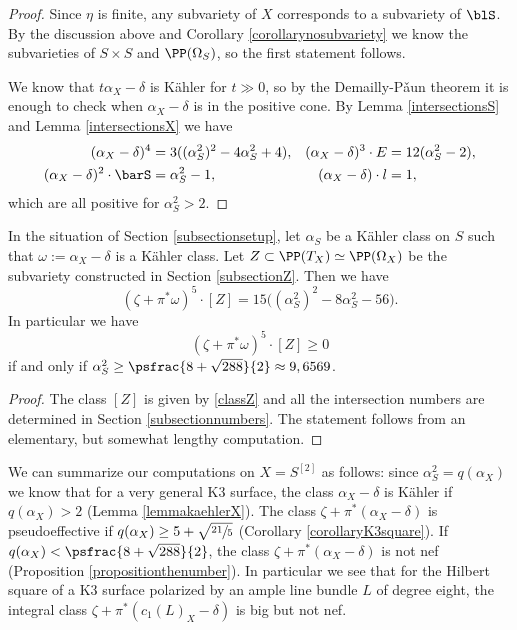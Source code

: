 \begin{proof}
Since $\eta$ is finite, any subvariety of $X$ corresponds to a subvariety of $\blS$. By the discussion above
and Corollary \ref{corollarynosubvariety}
we know the subvarieties of $S \times S$ and $\PP(\Omega_S)$, so the first statement follows.

We know that $t \alpha_X-\delta$ is Kähler for $t \gg 0$, so by the Demailly-P\v aun theorem it is enough to check when
$\alpha_X-\delta$ is in the positive cone. By Lemma \ref{intersectionsS} and Lemma \ref{intersectionsX} we have
\begin{align*}
(\alpha_X-\delta)^4 &= 3 ((\alpha_S^2)^2-4\alpha_S^2+4), &
(\alpha_X-\delta)^3 \cdot E &= 12 (\alpha_S^2-2),
\\
(\alpha_X-\delta)^2 \cdot \barS &= \alpha_S^2-1, &
(\alpha_X-\delta) \cdot l &= 1,
\end{align*}
which are all positive for $\alpha_S^2>2$.
\end{proof}

\begin{proposition} \label{propositionthenumber}
In the situation of Section \ref{subsectionsetup}, let
$\alpha_S$ be a Kähler class on $S$ such that $\omega:= \alpha_X-\delta$ is a Kähler class.
Let $Z \subset \PP(T_X) \simeq \PP(\Omega_X) $ be the subvariety constructed in Section \ref{subsectionZ}. Then we have
\[
(\zeta + \pi^* \omega)^5 \cdot [Z] =
15 \bigl(
(\alpha_S^2)^2 - 8 \alpha_S^2 - 56
\bigr).
\]
In particular we have
\[
(\zeta + \pi^* \omega)^5 \cdot [Z] \geq 0
\]
if and only if $\alpha_S^2 \geq \psfrac{8+\sqrt{288}}{2} \approx 9,6569$.
\end{proposition}

\begin{proof}
The class $[Z]$ is given by \eqref{classZ} and all the intersection numbers are determined in Section \ref{subsectionnumbers}. The statement follows from an elementary, but somewhat lengthy computation.
\end{proof}

We can summarize our computations on $X=S^{[2]}$ as follows:
since $\alpha_S^2=q(\alpha_X)$ we know that
for a very general K3 surface, the class $\alpha_X-\delta$ is Kähler if $q(\alpha_X)>2$ (Lemma \ref{lemmakaehlerX}).
The class $\zeta+\pi^*(\alpha_X-\delta)$ is pseudoeffective if $q(\alpha_X)\geq 5+\sqrt{\sfrac{21}{5}}$ (Corollary \ref{corollaryK3square}).
If $q(\alpha_X) < \psfrac{8+\sqrt{288}}{2}$, the class $\zeta+\pi^*(\alpha_X-\delta)$ is not nef (Proposition \ref{propositionthenumber}).
In particular we see that for the Hilbert square of a K3 surface polarized by an ample line bundle $L$ of degree eight, the integral class $\zeta+\pi^*(c_1(L)_X-\delta)$ is big but not nef.

